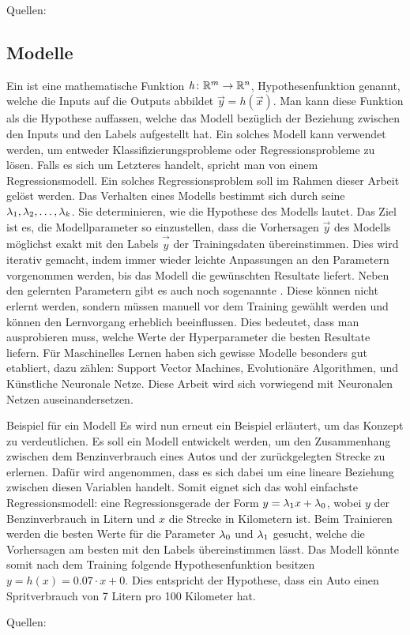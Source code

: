 \para{}
Quellen: \cite{Nielsen} \cite{book:hands-on}

\subsection{Modelle}
Ein  ist eine mathematische Funktion $\mathit{h}\colon \mathbb{R}^m
\to \mathbb{R}^n$, Hypothesenfunktion genannt, welche die Inputs auf die Outputs abbildet $\vec{y}=\mathit{h}(\vec{x})$.
Man kann diese Funktion als die Hypothese auffassen, welche das Modell bezüglich der Beziehung zwischen
den Inputs und den Labels aufgestellt hat.
Ein solches Modell kann verwendet werden, um entweder
Klassifizierungsprobleme oder Regressionsprobleme zu lösen. Falls es sich um
Letzteres handelt, spricht man von einem Regressionsmodell. Ein solches
Regressionsproblem soll im Rahmen dieser Arbeit gelöst werden.
\para{}
Das Verhalten eines Modells bestimmt sich durch seine 
$\lambda_1, \lambda_2,\ldots,\lambda_k$. Sie determinieren, wie die Hypothese des Modells lautet.
Das Ziel ist es, die Modellparameter so einzustellen, dass die Vorhersagen
$\vec{y}$ des Modells möglichst exakt mit den Labels $\vec{\hat{y}}$ der Trainingsdaten übereinstimmen.
Dies wird iterativ gemacht, indem immer wieder leichte Anpassungen an den
Parametern vorgenommen werden, bis das Modell die gewünschten Resultate liefert.
\para{}
Neben den gelernten Parametern gibt es auch noch sogenannte .
Diese können nicht erlernt werden, sondern müssen manuell vor dem Training gewählt werden und können den Lernvorgang erheblich beeinflussen.
Dies bedeutet, dass man ausprobieren muss, welche Werte der Hyperparameter
die besten Resultate liefern.
\para{}
Für Maschinelles Lernen haben sich gewisse Modelle besonders gut etabliert,
dazu zählen: Support Vector Machines, Evolutionäre Algorithmen, und Künstliche Neuronale Netze.
Diese Arbeit wird sich vorwiegend mit Neuronalen Netzen auseinandersetzen.
\para{}
\begin{examplebox}{Beispiel für ein Modell}
Es wird nun erneut ein Beispiel erläutert, um das Konzept zu verdeutlichen.
Es soll ein Modell entwickelt werden, um den Zusammenhang zwischen dem
Benzinverbrauch eines Autos und der zurückgelegten Strecke zu erlernen.
Dafür wird angenommen, dass es sich dabei um eine lineare Beziehung zwischen
diesen Variablen handelt. Somit eignet sich das wohl einfachste
Regressionsmodell: eine Regressionsgerade der Form $y=\lambda_1x + \lambda_0$, wobei
$y$ der Benzinverbrauch in Litern und $x$ die Strecke in Kilometern ist.
Beim Trainieren werden die besten Werte für die Parameter $\lambda_0$ und
$\lambda_1$ gesucht, welche die Vorhersagen am besten mit den Labels
übereinstimmen lässt. Das Modell könnte somit nach dem Training folgende
Hypothesenfunktion besitzen $y = h(x) = 0.07 \cdot x + 0$. Dies entspricht der
Hypothese, dass ein Auto einen Spritverbrauch von 7 Litern pro 100 Kilometer hat.
\end{examplebox}
\para{}
Quellen: \cite{book:hands-on}

